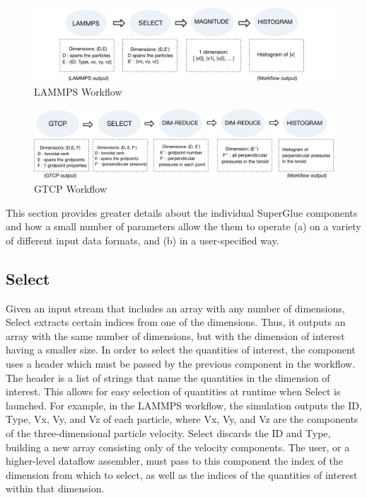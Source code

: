\documentclass[conference]{IEEEtran}
\begin{document}
\begin{figure}
  \vspace{-0.10in}
  \includegraphics[width=\linewidth]{fig/wflow3}
  \vspace{-0.35in}
  \caption{LAMMPS Workflow}
  \label{fig:lammps-workflow}
  \vspace{-0.05in}
\end{figure}

\begin{figure}
  \includegraphics[width=\linewidth]{fig/wflow4}
  \vspace{-0.35in}
  \caption{GTCP Workflow}
  \label{fig:gtcp-workflow}
  \vspace{-0.15in}
\end{figure}

This section provides greater details about the individual SuperGlue components
and how a small number of
parameters allow the them to operate (a) on a variety
of different input data formats, and (b) in
a user-specified way.

\subsection{Select}

Given an input stream that includes an array with any number of dimensions,
Select extracts certain indices from one of the dimensions. Thus, it outputs an array
with the same number of dimensions, but with the dimension of interest having a
smaller size. In order to select the quantities of interest, the
component uses a header which must be passed by the previous component in the
workflow. The header is a list of strings that name the quantities in the
dimension of interest. This allows for easy selection of quantities at runtime when
Select is launched. For example, in the LAMMPS workflow, the simulation outputs
the ID, Type, Vx, Vy, and Vz of each particle, where Vx, Vy, and Vz are the
components of the three-dimensional particle velocity.
Select discards the ID and Type, building a new array consisting only of the velocity components.
The user, or a higher-level dataflow assembler, must pass to
this component the index of the dimension from which to select, as well as the
indices of the quantities of interest within that dimension.
\end{document}
